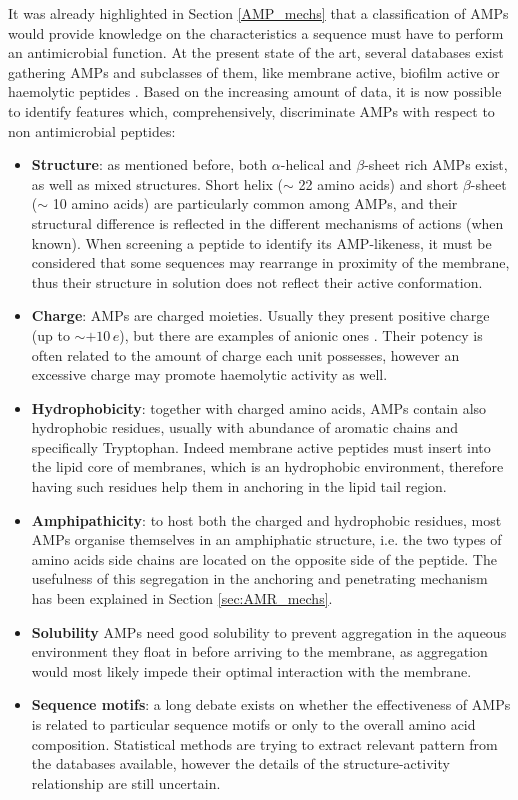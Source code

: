 It was already highlighted in Section \ref{AMP_mechs} that a classification of AMPs would provide knowledge on the characteristics a sequence must have to perform an antimicrobial function.
%
At the present state of the art, several databases exist gathering AMPs and subclasses of them, like membrane active, biofilm active or haemolytic peptides \cite{APD3, ???}. Based on the increasing amount of data, it is now possible to identify features which, comprehensively, discriminate AMPs with respect to non antimicrobial peptides:
%
\begin{itemize}
\item \textbf{Structure}: as mentioned before, both $\alpha$-helical and $\beta$-sheet rich AMPs exist, as well as mixed structures. Short helix ($\sim$ 22 amino acids) \cite{???} and short $\beta$-sheet ($\sim$ 10 amino acids) \cite{???} are particularly common among AMPs, and their structural difference is reflected in the different mechanisms of actions (when known). When screening a peptide to identify its AMP-likeness, it must be considered that some sequences may rearrange in proximity of the membrane, thus their structure in solution does not reflect their active conformation.
\item \textbf{Charge}: AMPs are charged moieties. Usually they present positive charge (up to $\sim + 10\,e$), but there are examples of anionic ones \cite{???see_example_on_AMPR}. Their potency is often related to the amount of charge each unit possesses, however an excessive charge may promote haemolytic activity as well. \cite{???}
\item \textbf{Hydrophobicity}: together with charged amino acids, AMPs contain also hydrophobic residues, usually with abundance of aromatic chains and specifically Tryptophan. Indeed membrane active peptides must insert into the lipid core of membranes, which is an hydrophobic environment, therefore having such residues help them in anchoring in the lipid tail region.
\item \textbf{Amphipathicity}: to host both the charged and hydrophobic residues, most AMPs organise themselves in an amphiphatic structure, i.e. the two types of amino acids side chains are located on the opposite side of the peptide. The usefulness of this segregation in the anchoring and penetrating mechanism has been explained in Section \ref{sec:AMR_mechs}.
\item \textbf{Solubility} AMPs need good solubility to prevent aggregation in the aqueous environment they float in before arriving to the membrane, as aggregation would most likely impede their optimal interaction with the membrane.
\item \textbf{Sequence motifs}: a long debate exists on whether the effectiveness of AMPs is related to particular sequence motifs or only to the overall amino acid composition. Statistical methods are trying to extract relevant pattern from the databases available, however the details of the structure-activity relationship are still uncertain.
\end{itemize}
